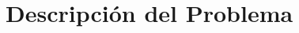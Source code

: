 \documentclass[a4paper, 12pt, english]{book}
\begin{document}
\section{Descripción del Problema}
\label{sec:descripcion}









\end{document}
